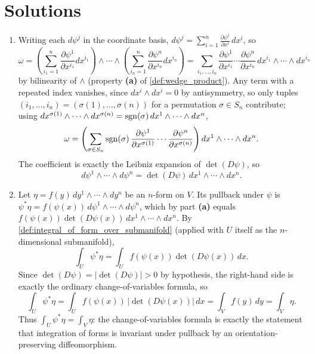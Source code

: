 
\section{Solutions}
\label{sec:pullbacks_solutions}

\begin{exercisesolution}
\label{sol:change_of_variables_differential_forms}
\begin{enumerate}[label=\textbf{(\alph*)}]
  \item Writing each $d\psi^j$ in the coordinate basis, $d\psi^j = \sum_{i=1}^n
    \frac{\partial\psi^j}{\partial x^i}\,dx^i$, so
    \[\omega = \left(\sum_{i_1=1}^n \frac{\partial\psi^1}{\partial x^{i_1}}dx^{i_1}\right)\wedge
      \cdots\wedge\left(\sum_{i_n=1}^n \frac{\partial\psi^n}{\partial x^{i_n}}dx^{i_n}\right)
      = \sum_{i_1,\ldots,i_n} \frac{\partial\psi^1}{\partial x^{i_1}}\cdots
      \frac{\partial\psi^n}{\partial x^{i_n}}\,dx^{i_1}\wedge\cdots\wedge dx^{i_n}\]
    by bilinearity of $\wedge$ (property \textbf{(a)} of \cref{def:wedge_product}). Any term with
    a
    repeated index vanishes, since $dx^i\wedge dx^i=0$ by antisymmetry, so only tuples
    $(i_1,\ldots,i_n) = (\sigma(1),\ldots,\sigma(n))$ for a permutation $\sigma \in S_n$
    contribute; using $dx^{\sigma(1)}\wedge\cdots\wedge dx^{\sigma(n)} = \operatorname{sgn}(\sigma)\,dx^1\wedge
    \cdots\wedge dx^n$,
    \[\omega = \left(\sum_{\sigma\in S_n} \operatorname{sgn}(\sigma)\,\frac{\partial\psi^1}{\partial
      x^{\sigma(1)}}\cdots\frac{\partial\psi^n}{\partial x^{\sigma(n)}}\right) dx^1\wedge\cdots
      \wedge dx^n.\]
    The coefficient is exactly the Leibniz expansion of $\det(D\psi)$, so
    \[\boxed{\ d\psi^1\wedge\cdots\wedge d\psi^n = \det(D\psi)\,dx^1\wedge\cdots\wedge dx^n.\ }\]
  \item Let $\eta = f(y)\,dy^1\wedge\cdots\wedge dy^n$ be an $n$-form on $V$. Its
    pullback under $\psi$ is $\psi^*\eta = f(\psi(x))\,d\psi^1\wedge\cdots\wedge d\psi^n$, which
    by part \textbf{(a)} equals $f(\psi(x))\det(D\psi(x))\,dx^1\wedge\cdots\wedge dx^n$. By
    \cref{def:integral_of_form_over_submanifold} (applied with $U$ itself as the $n$-dimensional
    submanifold),
    \[\int_U \psi^*\eta = \int_U f(\psi(x))\det(D\psi(x))\,dx.\]
    Since $\det(D\psi) = \lvert\det(D\psi)\rvert>0$ by hypothesis, the right-hand side is exactly
    the ordinary change-of-variables formula, so
    \[\int_U \psi^*\eta = \int_U f(\psi(x))\,\lvert\det(D\psi(x))\rvert\,dx = \int_V f(y)\,dy
      = \int_V \eta.\]
    Thus $\boxed{\int_U \psi^*\eta = \int_V \eta}$: the change-of-variables formula is exactly
    the statement that integration of forms is invariant under pullback by an
    orientation-preserving diffeomorphism.
\end{enumerate}
\end{exercisesolution}

